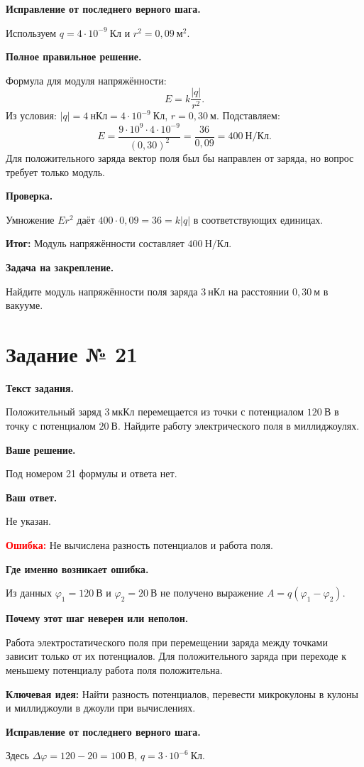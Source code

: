 \documentclass[11pt,a4paper]{article}
\newcommand{\reviewblock}[2]{\par\medskip\noindent\textbf{#1}\par\noindent#2\par}
\newcommand{\errorblock}[1]{\par\medskip\noindent\textcolor{red}{\textbf{Ошибка:}} #1\par}
\newcommand{\ideablock}[1]{\par\medskip\noindent\textcolor{blue!60!black}{\textbf{Ключевая идея:}} #1\par}
\newcommand{\resultblock}[1]{\par\medskip\noindent\textcolor{teal!60!black}{\textbf{Итог:}} #1\par}
\begin{document}
\reviewblock{Исправление от последнего верного шага.}{Используем $q=4\cdot10^{-9}\ \text{Кл}$ и $r^2=0{,}09\ \text{м}^2$.}

\reviewblock{Полное правильное решение.}{Формула для модуля напряжённости:
\[E=k\frac{|q|}{r^2}.\]
Из условия: $|q|=4\ \text{нКл}=4\cdot10^{-9}\ \text{Кл}$, $r=0{,}30\ \text{м}$. Подставляем:
\[E=\frac{9\cdot10^9\cdot4\cdot10^{-9}}{(0{,}30)^2}=\frac{36}{0{,}09}=400\ \text{Н/Кл}.\]
Для положительного заряда вектор поля был бы направлен от заряда, но вопрос требует только модуль.}

\reviewblock{Проверка.}{Умножение $E r^2$ даёт $400\cdot0{,}09=36=k|q|$ в соответствующих единицах.}

\resultblock{Модуль напряжённости составляет $400\ \text{Н/Кл}$.}

\reviewblock{Задача на закрепление.}{Найдите модуль напряжённости поля заряда $3\ \text{нКл}$ на расстоянии $0{,}30\ \text{м}$ в вакууме.}
\newpage
{}\label{task:21}

\section*{Задание № 21}

\reviewblock{Текст задания.}{Положительный заряд $3\ \text{мкКл}$ перемещается из точки с потенциалом $120\ \text{В}$ в точку с потенциалом $20\ \text{В}$. Найдите работу электрического поля в миллиджоулях.}

\reviewblock{Ваше решение.}{Под номером 21 формулы и ответа нет.}

\reviewblock{Ваш ответ.}{Не указан.}

\errorblock{Не вычислена разность потенциалов и работа поля.}

\reviewblock{Где именно возникает ошибка.}{Из данных $\varphi_1=120\ \text{В}$ и $\varphi_2=20\ \text{В}$ не получено выражение $A=q(\varphi_1-\varphi_2)$.}

\reviewblock{Почему этот шаг неверен или неполон.}{Работа электростатического поля при перемещении заряда между точками зависит только от их потенциалов. Для положительного заряда при переходе к меньшему потенциалу работа поля положительна.}

\ideablock{Найти разность потенциалов, перевести микрокулоны в кулоны и миллиджоули в джоули при вычислениях.}

\reviewblock{Исправление от последнего верного шага.}{Здесь $\Delta\varphi=120-20=100\ \text{В}$, $q=3\cdot10^{-6}\ \text{Кл}$.}
\end{document}
